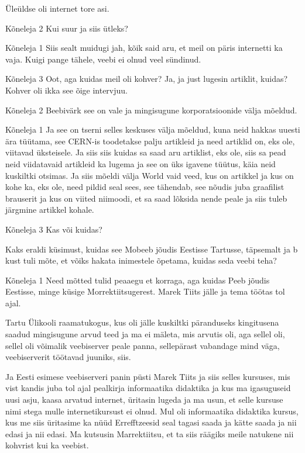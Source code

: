 Üleüldse oli internet tore asi. 

Kõneleja 2
Kui suur ja siis ütleks? 

Kõneleja 1
Siis sealt muidugi jah, kõik said aru, et meil on päris internetti ka vaja. Kuigi pange tähele, veebi ei olnud veel sündinud. 

Kõneleja 3
Oot, aga kuidas meil oli kohver? Ja, ja just lugesin artiklit, kuidas? Kohver oli ikka see õige intervjuu. 

Kõneleja 2
Beebivärk see on vale ja mingisugune korporatsioonide välja mõeldud. 

Kõneleja 1
Ja see on tserni selles keskuses välja mõeldud, kuna neid hakkas uuesti ära tüütama, see CERN-is toodetakse palju artikleid ja need artiklid on, eks ole, viitavad üksteisele. Ja siis siis kuidas sa saad aru artiklist, eks ole, siis sa pead neid viidatavaid artikleid ka lugema ja see on üks igavene tüütus, käia neid kuskiltki otsimas. Ja siis mõeldi välja World vaid veed, kus on artikkel ja kus on kohe ka, eks ole, need pildid seal sees, see tähendab, see nõudis juba graafilist brauserit ja kus on viited niimoodi, et sa saad lõksida nende peale ja siis tuleb järgmine artikkel kohale. 

Kõneleja 3
Kas või kuidas? 

Kaks eraldi küsimust, kuidas see Mobeeb jõudis Eestisse Tartusse, täpsemalt ja b kust tuli mõte, et võiks hakata inimestele õpetama, kuidas seda veebi teha? 

Kõneleja 1
Need mõtted tulid peaaegu et korraga, aga kuidas Peeb jõudis Eestisse, minge küsige Morrektiitsugerest. Marek Tiits jälle ja tema töötas tol ajal. 

Tartu Ülikooli raamatukogus, kus oli jälle kuskiltki päranduseks kingitusena saadud mingisugune arvud teed ja ma ei mäleta, mis arvutis oli, aga sellel oli, sellel oli võimalik veebiserver peale panna, sellepärast vabandage mind väga, veebiserverit töötavad juuniks, siis. 

Ja Eesti esimese veebiserveri panin püsti Marek Tiits ja siis selles kursuses, mis vist kandis juba tol ajal pealkirja informaatika didaktika ja kus ma igasuguseid uusi asju, kaasa arvatud internet, üritasin lugeda ja ma usun, et selle kursuse nimi stega mulle internetikursust ei olnud. Mul oli informaatika didaktika kursus, kus me siis üritasime ka nüüd Errefftzeesid seal tagasi saada ja kätte saada ja nii edasi ja nii edasi. Ma kutsusin Marrektiitsu, et ta siis räägiks meile natukene nii kohvrist kui ka veebist. 


